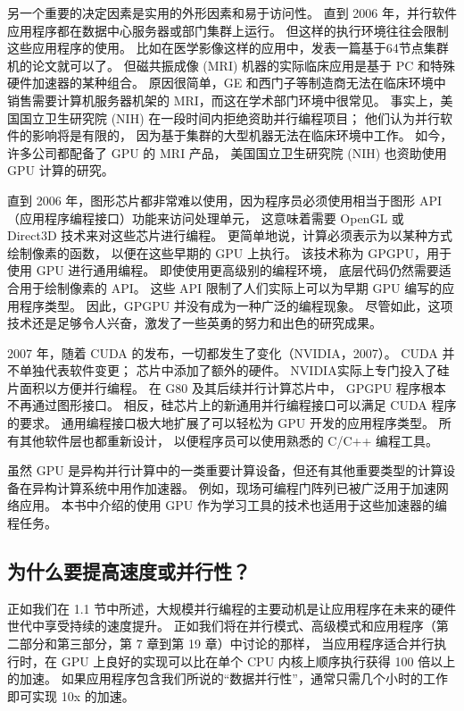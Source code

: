 另一个重要的决定因素是实用的外形因素和易于访问性。 直到 2006 年，并行软件应用程序都在数据中心服务器或部门集群上运行。 
但这样的执行环境往往会限制这些应用程序的使用。 比如在医学影像这样的应用中，发表一篇基于64节点集群机的论文就可以了。 
但磁共振成像 (MRI) 机器的实际临床应用是基于 PC 和特殊硬件加速器的某种组合。 
原因很简单，GE 和西门子等制造商无法在临床环境中销售需要计算机服务器机架的 MRI，而这在学术部门环境中很常见。 
事实上，美国国立卫生研究院 (NIH) 在一段时间内拒绝资助并行编程项目； 他们认为并行软件的影响将是有限的，
因为基于集群的大型机器无法在临床环境中工作。 如今，许多公司都配备了 GPU 的 MRI 产品，
美国国立卫生研究院 (NIH) 也资助使用 GPU 计算的研究。

直到 2006 年，图形芯片都非常难以使用，因为程序员必须使用相当于图形 API（应用程序编程接口）功能来访问处理单元，
这意味着需要 OpenGL 或 Direct3D 技术来对这些芯片进行编程。 更简单地说，计算必须表示为以某种方式绘制像素的函数，
以便在这些早期的 GPU 上执行。 该技术称为 GPGPU，用于使用 GPU 进行通用编程。 即使使用更高级别的编程环境，
底层代码仍然需要适合用于绘制像素的 API。 这些 API 限制了人们实际上可以为早期 GPU 编写的应用程序类型。 
因此，GPGPU 并没有成为一种广泛的编程现象。 尽管如此，这项技术还是足够令人兴奋，激发了一些英勇的努力和出色的研究成果。

2007 年，随着 CUDA 的发布，一切都发生了变化（NVIDIA，2007）。 CUDA 并不单独代表软件变更； 
芯片中添加了额外的硬件。 NVIDIA实际上专门投入了硅片面积以方便并行编程。 在 G80 及其后续并行计算芯片中，
GPGPU 程序根本不再通过图形接口。 相反，硅芯片上的新通用并行编程接口可以满足 CUDA 程序的要求。 
通用编程接口极大地扩展了可以轻松为 GPU 开发的应用程序类型。 所有其他软件层也都重新设计，
以便程序员可以使用熟悉的 C/C++ 编程工具。

虽然 GPU 是异构并行计算中的一类重要计算设备，但还有其他重要类型的计算设备在异构计算系统中用作加速器。 
例如，现场可编程门阵列已被广泛用于加速网络应用。 本书中介绍的使用 GPU 作为学习工具的技术也适用于这些加速器的编程任务。

\subsection{为什么要提高速度或并行性？}
正如我们在 1.1 节中所述，大规模并行编程的主要动机是让应用程序在未来的硬件世代中享受持续的速度提升。 
正如我们将在并行模式、高级模式和应用程序（第二部分和第三部分，第 7 章到第 19 章）中讨论的那样，
当应用程序适合并行执行时，在 GPU 上良好的实现可以比在单个 CPU 内核上顺序执行获得 100 倍以上的加速。
如果应用程序包含我们所说的“数据并行性”，通常只需几个小时的工作即可实现 10x 的加速。

